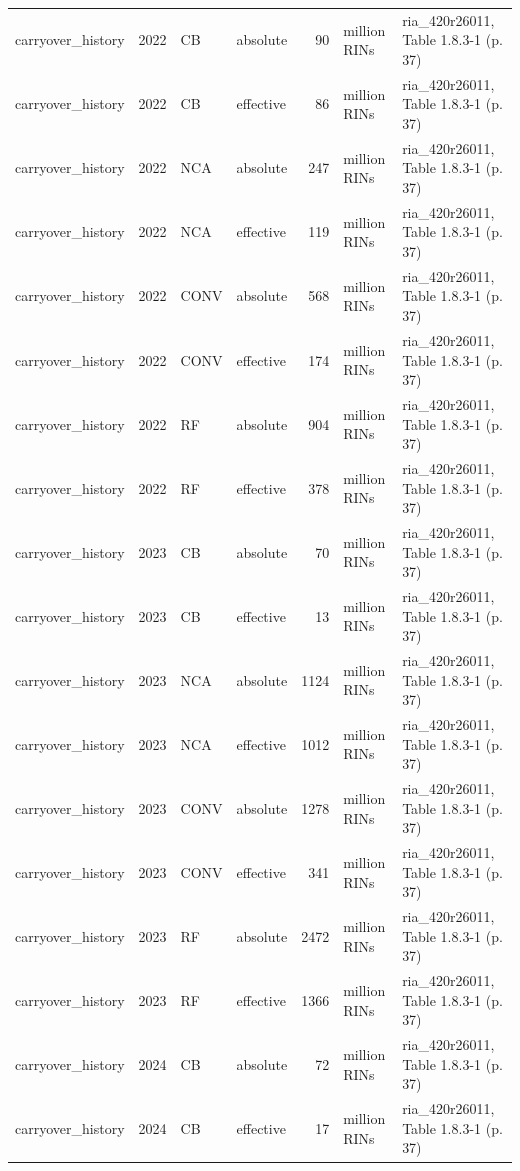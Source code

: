 \begin{longtable}{p{2.3cm}p{0.7cm}p{1.0cm}p{2.6cm}rp{1.7cm}p{4.6cm}}
carryover\_history & 2022 & CB & absolute & 90 & million RINs & ria\_420r26011, Table 1.8.3-1 (p. 37) \\
carryover\_history & 2022 & CB & effective & 86 & million RINs & ria\_420r26011, Table 1.8.3-1 (p. 37) \\
carryover\_history & 2022 & NCA & absolute & 247 & million RINs & ria\_420r26011, Table 1.8.3-1 (p. 37) \\
carryover\_history & 2022 & NCA & effective & 119 & million RINs & ria\_420r26011, Table 1.8.3-1 (p. 37) \\
carryover\_history & 2022 & CONV & absolute & 568 & million RINs & ria\_420r26011, Table 1.8.3-1 (p. 37) \\
carryover\_history & 2022 & CONV & effective & 174 & million RINs & ria\_420r26011, Table 1.8.3-1 (p. 37) \\
carryover\_history & 2022 & RF & absolute & 904 & million RINs & ria\_420r26011, Table 1.8.3-1 (p. 37) \\
carryover\_history & 2022 & RF & effective & 378 & million RINs & ria\_420r26011, Table 1.8.3-1 (p. 37) \\
carryover\_history & 2023 & CB & absolute & 70 & million RINs & ria\_420r26011, Table 1.8.3-1 (p. 37) \\
carryover\_history & 2023 & CB & effective & 13 & million RINs & ria\_420r26011, Table 1.8.3-1 (p. 37) \\
carryover\_history & 2023 & NCA & absolute & 1124 & million RINs & ria\_420r26011, Table 1.8.3-1 (p. 37) \\
carryover\_history & 2023 & NCA & effective & 1012 & million RINs & ria\_420r26011, Table 1.8.3-1 (p. 37) \\
carryover\_history & 2023 & CONV & absolute & 1278 & million RINs & ria\_420r26011, Table 1.8.3-1 (p. 37) \\
carryover\_history & 2023 & CONV & effective & 341 & million RINs & ria\_420r26011, Table 1.8.3-1 (p. 37) \\
carryover\_history & 2023 & RF & absolute & 2472 & million RINs & ria\_420r26011, Table 1.8.3-1 (p. 37) \\
carryover\_history & 2023 & RF & effective & 1366 & million RINs & ria\_420r26011, Table 1.8.3-1 (p. 37) \\
carryover\_history & 2024 & CB & absolute & 72 & million RINs & ria\_420r26011, Table 1.8.3-1 (p. 37) \\
carryover\_history & 2024 & CB & effective & 17 & million RINs & ria\_420r26011, Table 1.8.3-1 (p. 37) \\

\end{longtable}
